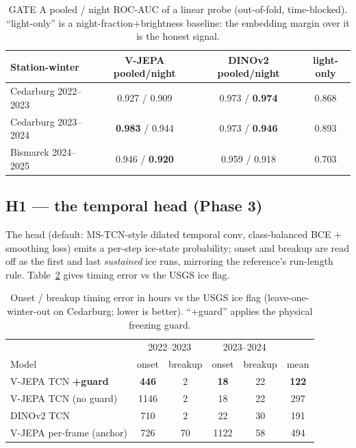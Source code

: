 \documentclass[11pt]{article}
\newcommand{\hh}[1]{\textbf{\color{black!80}#1}}
\begin{document}
\begin{table}[h]\centering\small
\caption{GATE A pooled / night ROC-AUC of a linear probe (out-of-fold, time-blocked).
``light-only'' is a night-fraction$+$brightness baseline: the embedding margin over it is the
honest signal.}\label{tab:gatea}
\begin{tabular}{lccc}
\toprule
Station-winter & V-JEPA pooled/night & DINOv2 pooled/night & light-only \\
\midrule
Cedarburg 2022--2023 & 0.927 / 0.909 & 0.973 / \textbf{0.974} & 0.868 \\
Cedarburg 2023--2024 & \textbf{0.983} / 0.944 & 0.973 / \textbf{0.946} & 0.893 \\
Bismarck 2024--2025  & 0.946 / \textbf{0.920} & 0.959 / 0.918 & 0.703 \\
\bottomrule
\end{tabular}
\end{table}

\subsection{H1 --- the temporal head (Phase 3)}
The head (default: MS-TCN-style dilated temporal conv, class-balanced BCE $+$ smoothing loss)
emits a per-step ice-state probability; onset and breakup are read off as the first and last
\emph{sustained} ice runs, mirroring the reference's run-length rule. Table~\ref{tab:h1} gives
timing error vs the USGS ice flag.

\begin{table}[h]\centering\small
\caption{Onset / breakup timing error in hours vs the USGS ice flag (leave-one-winter-out on
Cedarburg; lower is better). ``+guard'' applies the physical freezing guard.}\label{tab:h1}
\begin{tabular}{lccccc}
\toprule
 & \multicolumn{2}{c}{2022--2023} & \multicolumn{2}{c}{2023--2024} & \\
Model & onset & breakup & onset & breakup & mean \\
\midrule
V-JEPA TCN \hh{+guard}      & \textbf{446} & 2 & \textbf{18} & 22 & \textbf{122} \\
V-JEPA TCN (no guard)       & 1146 & 2 & 18 & 22 & 297 \\
DINOv2 TCN                  & 710  & 2 & 22 & 30 & 191 \\
V-JEPA per-frame (anchor)   & 726  & 70 & 1122 & 58 & 494 \\
\bottomrule
\end{tabular}
\end{table}
\end{document}
